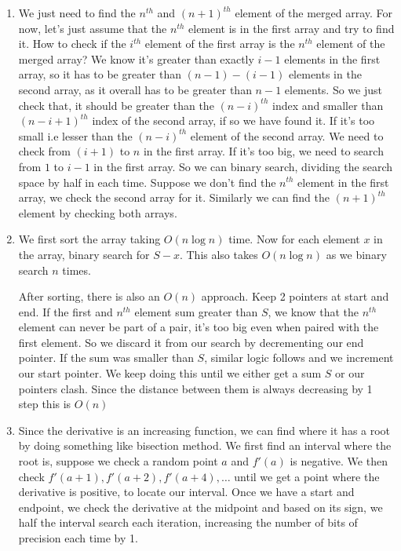 \documentclass[12pt]{report}
\begin{document}
\begin{enumerate}[label=\textbf{\arabic*.}]
  \item We just need to find the $n^{th}$ and $(n+1)^{th}$ element of the merged array. For now, let's just assume 
  that the $n^{th}$ element is in the first array and try to find it. How to check if the $i^{th}$ element of the 
  first array is the $n^{th}$ element of the merged array? We know it's greater than exactly $i-1$ elements in the
  first array, so it has to be greater than $(n-1)-(i-1)$ elements in the second array, as it overall has to be greater
  than $n-1$ elements. So we just check that, it should be greater than the $(n-i)^{th}$ index and smaller than $(n-i+1)^{th}$
  index of the second array, if so we have found it. If it's too small i.e lesser than the $(n-i)^{th}$ element of 
  the second array. We need to check from $(i+1)$ to $n$ in the first array. If it's too big, we need to search from $1$ to 
  $i-1$ in the first array. So we can binary search, dividing the search space by half in each time. Suppose we don't
  find the $n^{th}$ element in the first array, we check the second array for it. Similarly we can find the $(n+1)^{th}$
  element by checking both arrays.

  \item We first sort the array taking $O(n \log n)$ time. Now for each element $x$ in the array, binary search for $S-x$.
  This also takes $O(n \log n)$ as we binary search $n$ times.
  
  After sorting, there is also an $O(n)$ approach. Keep 2 pointers at start and end. If the first and $n^{th}$ element
  sum greater than $S$, we know that the $n^{th}$ element can never be part of a pair, it's too big even when paired 
  with the first element. So we discard it from our search by decrementing our end pointer. If the sum was smaller than 
  $S$, similar logic follows and we increment our start pointer. We keep doing this until we either get a sum $S$ or 
  our pointers clash. Since the distance between them is always decreasing by 1 step this is $O(n)$

  \item Since the derivative is an increasing function, we can find where it has a root by doing something like bisection
  method. We first find an interval where the root is, suppose we check a random point $a$ and $f'(a)$ is negative.
  We then check $f'(a+1), f'(a+2), f'(a+4), \dots$ until we get a point where the derivative is positive, to
  locate our interval. Once we have a start and endpoint, we check the derivative at the midpoint and based on 
  its sign, we half the interval search each iteration, increasing the number of bits of precision each time by 1.


\end{enumerate}
\end{document}
